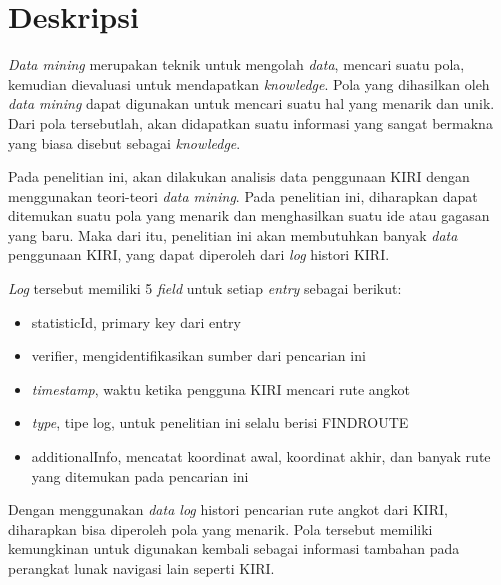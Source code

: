 \documentclass[a4paper,twoside]{article}
\begin{document}
\title{\@judultopik}
\author{\nama \textendash \@npm} 

\newcommand{\nama}{Jovan Gunawan}
\newcommand{\@npm}{2011730029}
\newcommand{\@judultopik}{\textsl{Data Mining} Histori Pencarian Rute Angkot} %
\newcommand{\jumpemb}{1} %
\newcommand{\tanggal}{7/06/2014}
\maketitle


\section{Deskripsi}
\textsl{Data mining} merupakan teknik untuk mengolah \textsl{data}, mencari suatu pola, kemudian dievaluasi untuk mendapatkan \textsl{knowledge}. Pola yang dihasilkan oleh \textsl{data mining} dapat digunakan untuk mencari suatu hal yang menarik dan unik. Dari pola tersebutlah, akan didapatkan suatu informasi yang sangat bermakna yang biasa disebut sebagai \textsl{knowledge}.

Pada penelitian ini, akan dilakukan analisis data penggunaan KIRI dengan menggunakan teori-teori \textsl{data mining}. Pada penelitian ini, diharapkan dapat ditemukan suatu pola yang menarik dan menghasilkan suatu ide atau gagasan yang baru. Maka dari itu, penelitian ini akan membutuhkan banyak \textsl{data} penggunaan KIRI, yang dapat diperoleh dari \textsl{log} histori KIRI.

\textsl{Log} tersebut memiliki 5 \textsl{field} untuk setiap \textsl{entry} sebagai berikut:
\begin{itemize}
	\item statisticId, primary key dari entry
	\item verifier, mengidentifikasikan sumber dari pencarian ini
	\item \textsl{timestamp}, waktu ketika pengguna KIRI mencari rute angkot
	\item \textsl{type}, tipe log, untuk penelitian ini selalu berisi FINDROUTE
	\item additionalInfo, mencatat koordinat awal, koordinat akhir, dan banyak rute yang ditemukan pada pencarian ini
\end{itemize}

Dengan menggunakan \textsl{data log} histori pencarian rute angkot dari KIRI, diharapkan bisa diperoleh pola yang menarik. Pola tersebut memiliki kemungkinan untuk digunakan kembali sebagai informasi tambahan pada perangkat lunak navigasi lain seperti KIRI.
\end{document}
